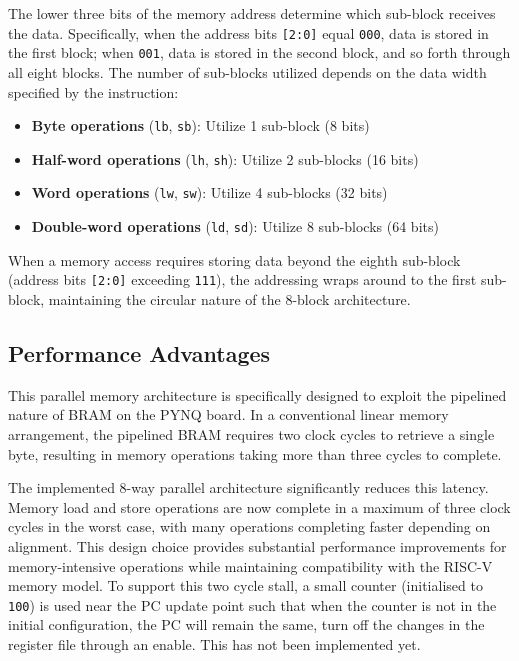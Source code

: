 \documentclass{article}
\begin{document}
The lower three bits of the memory address determine which sub-block receives the data. Specifically, when the address bits \texttt{[2:0]} equal \texttt{000}, data is stored in the first block; when \texttt{001}, data is stored in the second block, and so forth through all eight blocks. The number of sub-blocks utilized depends on the data width specified by the instruction:

\begin{itemize}
    \item \textbf{Byte operations} (\texttt{lb}, \texttt{sb}): Utilize 1 sub-block (8 bits)
    \item \textbf{Half-word operations} (\texttt{lh}, \texttt{sh}): Utilize 2 sub-blocks (16 bits)
    \item \textbf{Word operations} (\texttt{lw}, \texttt{sw}): Utilize 4 sub-blocks (32 bits)
    \item \textbf{Double-word operations} (\texttt{ld}, \texttt{sd}): Utilize 8 sub-blocks (64 bits)
\end{itemize}

When a memory access requires storing data beyond the eighth sub-block (address bits \texttt{[2:0]} exceeding \texttt{111}), the addressing wraps around to the first sub-block, maintaining the circular nature of the 8-block architecture.

\subsection*{Performance Advantages}

This parallel memory architecture is specifically designed to exploit the pipelined nature of BRAM on the PYNQ board. In a conventional linear memory arrangement, the pipelined BRAM requires two clock cycles to retrieve a single byte, resulting in memory operations taking more than three cycles to complete.

The implemented 8-way parallel architecture significantly reduces this latency. Memory load and store operations are now complete in a maximum of three clock cycles in the worst case, with many operations completing faster depending on alignment. This design choice provides substantial performance improvements for memory-intensive operations while maintaining compatibility with the RISC-V memory model. To support this two cycle stall, a small counter (initialised to \texttt{100}) is used near the PC update point such that when the counter is not in the initial configuration, the PC will remain the same, turn off the changes in the register file through an enable. This has not been implemented yet.
\end{document}
